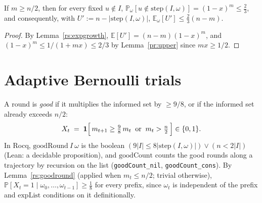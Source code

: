 \begin{lemma}\label{rs:contract}
  \rocqok
  If $m \ge n/2$, then for every fixed $u \notin I$,
  $\mathbb{P}_\omega[u \notin \mathrm{step}(I,\omega)] = (1-x)^m \le \tfrac23$,
  and consequently, with $U' := n - |\mathrm{step}(I,\omega)|$,
  $\mathbb{E}_\omega[U'] \le \tfrac23(n-m)$.
\end{lemma}
\begin{proof}
  \rocqok
  By Lemma~\ref{rs:expgrowth}, $\mathbb{E}[U'] = (n-m)(1-x)^m$, and
  $(1-x)^m \le 1/(1 + mx) \le 2/3$ by Lemma~\ref{pr:upper} since
  $mx \ge 1/2$.
\end{proof}

\section{Adaptive Bernoulli trials}\label{rs:sec:adaptive}

\begin{definition}\label{rs:good}
  \rocqok
  A round is \emph{good} if it multiplies the informed set by $\ge 9/8$, or
  if the informed set already exceeds $n/2$:
  \[
    X_t \;=\; \mathbf{1}\Bigl[\, m_{t+1} \ge \tfrac98\, m_t
    \;\;\text{or}\;\; m_t > \tfrac n2 \,\Bigr] \in \{0,1\}.
  \]
  In Rocq, $\mathrm{goodRound}\ I\ \omega$ is the boolean
  $(9|I| \le 8|\mathrm{step}(I,\omega)|) \lor (n < 2|I|)$ (Lean: a decidable
  proposition), and $\mathrm{goodCount}$ counts the good rounds along a
  trajectory by recursion on the list (\texttt{goodCount\_nil},
  \texttt{goodCount\_cons}). By
  Lemma~\ref{rs:goodround} (applied when $m_t \le n/2$; trivial otherwise),
  $\mathbb{P}[X_t = 1 \mid \omega_0,\dots,\omega_{t-1}] \ge \tfrac18$ for every
  prefix, since $\omega_t$ is independent of the prefix and
  $\mathrm{expList}$ conditions on it definitionally.
\end{definition}

